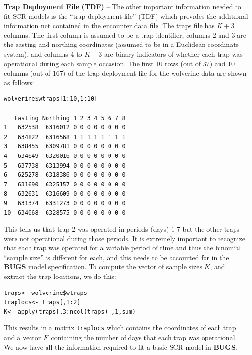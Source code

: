 {\flushleft \bf Trap Deployment File (TDF)} -- The other important
information needed to fit SCR models is the ``trap deployment file''
(TDF) which provides the additional information not contained in the
encounter data file. The traps file has $K + 3$ columns. The first
column is assumed to be a trap identifier, columns 2 and 3 are the
easting and northing coordinates (assumed to be in a Euclidean
coordinate system), and columns 4 to $K + 3$ are binary indicators of
whether each trap was operational during each sample occasion. The
first 10 rows (out of 37) and 10 columns (out of 167) of the trap
deployment file for the wolverine data are shown as follows:
{\small
\begin{verbatim}
wolverine$wtraps[1:10,1:10]

   Easting Northing 1 2 3 4 5 6 7 8
1   632538  6316012 0 0 0 0 0 0 0 0
2   634822  6316568 1 1 1 1 1 1 1 1
3   638455  6309781 0 0 0 0 0 0 0 0
4   634649  6320016 0 0 0 0 0 0 0 0
5   637738  6313994 0 0 0 0 0 0 0 0
6   625278  6318386 0 0 0 0 0 0 0 0
7   631690  6325157 0 0 0 0 0 0 0 0
8   632631  6316609 0 0 0 0 0 0 0 0
9   631374  6331273 0 0 0 0 0 0 0 0
10  634068  6328575 0 0 0 0 0 0 0 0
\end{verbatim}
}
This tells us that trap 2 was operated in periods (days) 1-7 but the
other traps were not operational during those periods. It is extremely
important to recognize that each trap was operated for a variable
period of time and thus the binomial ``sample size'' is different for
each, and this needs to be accounted for in the {\bf BUGS} model
specification.  To compute the vector of sample sizes $K$, and extract
the trap locations, we do this:
\begin{verbatim}
traps<- wolverine$wtraps
traplocs<- traps[,1:2]
K<- apply(traps[,3:ncol(traps)],1,sum)
\end{verbatim}
This results in a matrix \mbox{\tt traplocs} which contains the
coordinates of each trap and a vector $K$ containing the number of
days that each trap was operational. We now have all the information
required to fit a basic SCR model in {\bf BUGS}.



